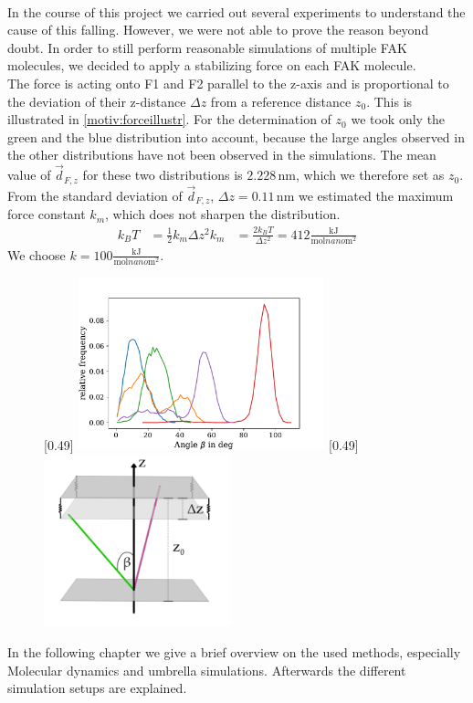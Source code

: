 \\
In the course of this project we carried out several experiments to understand the cause of this falling. However, we were not able to prove the reason beyond doubt. In order to still perform reasonable simulations of multiple FAK molecules, we decided to apply a stabilizing force on each FAK molecule.\\
The force is acting onto F1 and F2 parallel to the z-axis and is proportional to the deviation of their z-distance $\Delta z$ from a reference distance $z_0$. This is illustrated in \autoref{motiv:forceillustr}. For the determination of $z_0$ we took only the green and the blue distribution into account, because the large angles observed in the other distributions have not been observed in the \charmm{} simulations. The mean value of $\vec{d}_{F, z}$ for these two distributions is $2.228\,\si{\nano\metre}$, which we therefore set as $z_0$. From the standard deviation of $\vec{d}_{F, z}$, $\Delta z = 0.11\,\si{\nano\metre}$ we estimated the maximum force constant $k_m$, which does not sharpen the distribution.
\begin{align}
	k_B T &= \frac{1}{2} k_m \Delta z^2
	k_m &= \frac{2 k_B T}{\Delta z^2} = 412 \frac{\si{\kilo\joule}}{\si{\mole} \si{nano\metre}^2}
\end{align} 
We choose $k = 100 \frac{\si{\kilo\joule}}{\si{\mole} \si{nano\metre}^2}$.
%
%
%
\begin{figure}
	\subcaptionbox{\label{motiv:sarascurves}}[0.49\textwidth]{
		\includegraphics[height=5cm]{figures/introduction/sara_angles}
	}\hfill%
	\subcaptionbox{\label{motiv:forceillustr}}[0.49\textwidth]{
		\includegraphics[height=5cm]{figures/introduction/forceapproach}
	}%
\end{figure}
%
%
%
In the following chapter we give a brief overview on the used methods, especially Molecular dynamics and umbrella simulations. Afterwards the different simulation setups are explained.
